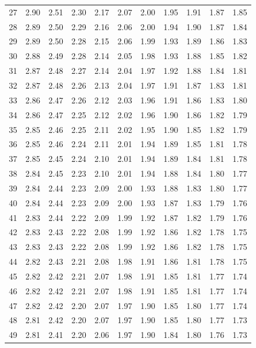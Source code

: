 \documentclass[
]{book}
\theoremstyle{definition}
\theoremstyle{definition}
\theoremstyle{definition}
\theoremstyle{definition}
\theoremstyle{remark}
\begin{document}
\begin{longtable}[]{@{}ccccccccccc@{}}
27 & 2.90 & 2.51 & 2.30 & 2.17 & 2.07 & 2.00 & 1.95 & 1.91 & 1.87 & 1.85 \\
28 & 2.89 & 2.50 & 2.29 & 2.16 & 2.06 & 2.00 & 1.94 & 1.90 & 1.87 & 1.84 \\
29 & 2.89 & 2.50 & 2.28 & 2.15 & 2.06 & 1.99 & 1.93 & 1.89 & 1.86 & 1.83 \\
30 & 2.88 & 2.49 & 2.28 & 2.14 & 2.05 & 1.98 & 1.93 & 1.88 & 1.85 & 1.82 \\
31 & 2.87 & 2.48 & 2.27 & 2.14 & 2.04 & 1.97 & 1.92 & 1.88 & 1.84 & 1.81 \\
32 & 2.87 & 2.48 & 2.26 & 2.13 & 2.04 & 1.97 & 1.91 & 1.87 & 1.83 & 1.81 \\
33 & 2.86 & 2.47 & 2.26 & 2.12 & 2.03 & 1.96 & 1.91 & 1.86 & 1.83 & 1.80 \\
34 & 2.86 & 2.47 & 2.25 & 2.12 & 2.02 & 1.96 & 1.90 & 1.86 & 1.82 & 1.79 \\
35 & 2.85 & 2.46 & 2.25 & 2.11 & 2.02 & 1.95 & 1.90 & 1.85 & 1.82 & 1.79 \\
36 & 2.85 & 2.46 & 2.24 & 2.11 & 2.01 & 1.94 & 1.89 & 1.85 & 1.81 & 1.78 \\
37 & 2.85 & 2.45 & 2.24 & 2.10 & 2.01 & 1.94 & 1.89 & 1.84 & 1.81 & 1.78 \\
38 & 2.84 & 2.45 & 2.23 & 2.10 & 2.01 & 1.94 & 1.88 & 1.84 & 1.80 & 1.77 \\
39 & 2.84 & 2.44 & 2.23 & 2.09 & 2.00 & 1.93 & 1.88 & 1.83 & 1.80 & 1.77 \\
40 & 2.84 & 2.44 & 2.23 & 2.09 & 2.00 & 1.93 & 1.87 & 1.83 & 1.79 & 1.76 \\
41 & 2.83 & 2.44 & 2.22 & 2.09 & 1.99 & 1.92 & 1.87 & 1.82 & 1.79 & 1.76 \\
42 & 2.83 & 2.43 & 2.22 & 2.08 & 1.99 & 1.92 & 1.86 & 1.82 & 1.78 & 1.75 \\
43 & 2.83 & 2.43 & 2.22 & 2.08 & 1.99 & 1.92 & 1.86 & 1.82 & 1.78 & 1.75 \\
44 & 2.82 & 2.43 & 2.21 & 2.08 & 1.98 & 1.91 & 1.86 & 1.81 & 1.78 & 1.75 \\
45 & 2.82 & 2.42 & 2.21 & 2.07 & 1.98 & 1.91 & 1.85 & 1.81 & 1.77 & 1.74 \\
46 & 2.82 & 2.42 & 2.21 & 2.07 & 1.98 & 1.91 & 1.85 & 1.81 & 1.77 & 1.74 \\
47 & 2.82 & 2.42 & 2.20 & 2.07 & 1.97 & 1.90 & 1.85 & 1.80 & 1.77 & 1.74 \\
48 & 2.81 & 2.42 & 2.20 & 2.07 & 1.97 & 1.90 & 1.85 & 1.80 & 1.77 & 1.73 \\
49 & 2.81 & 2.41 & 2.20 & 2.06 & 1.97 & 1.90 & 1.84 & 1.80 & 1.76 & 1.73 \\

\end{longtable}
\end{document}
